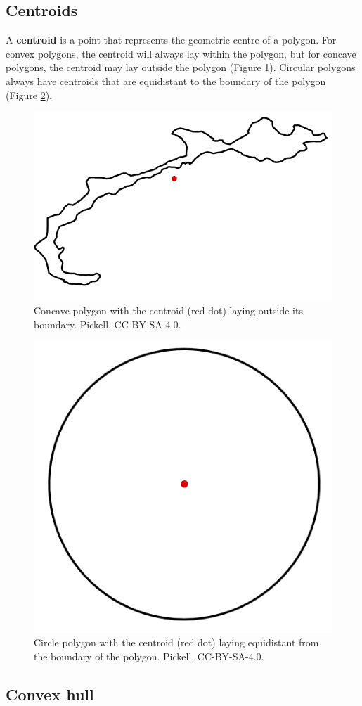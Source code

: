 \documentclass[
]{book}
\begin{document}
\subsection{Centroids}\label{centroids}

A \textbf{centroid} is a point that represents the geometric centre of a polygon. For convex polygons, the centroid will always lay within the polygon, but for concave polygons, the centroid may lay outside the polygon (Figure \ref{fig:7-concave-polygon-centroid}). Circular polygons always have centroids that are equidistant to the boundary of the polygon (Figure \ref{fig:7-circle-polygon-centroid}).

\begin{figure}
\includegraphics[width=0.5\linewidth]{images/07-concave-polygon-centroid} \caption{Concave polygon with the centroid (red dot) laying outside its boundary. Pickell, CC-BY-SA-4.0.}\label{fig:7-concave-polygon-centroid}
\end{figure}

\begin{figure}
\includegraphics[width=0.5\linewidth]{images/07-circle-polygon-centroid} \caption{Circle polygon with the centroid (red dot) laying equidistant from the boundary of the polygon. Pickell, CC-BY-SA-4.0.}\label{fig:7-circle-polygon-centroid}
\end{figure}

\subsection{Convex hull}\label{convex-hull}
\end{document}
